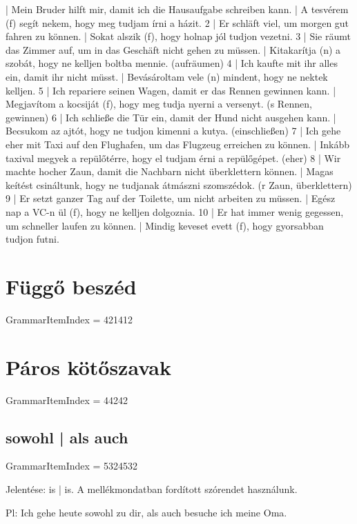 \documentclass{article}
\newenvironment{desc}{\verbatim}{\endverbatim}
\newenvironment{exmp}{\verbatim}{\endverbatim}
\begin{document}
\begin{exmp}
1 | Mein Bruder hilft mir, damit ich die Hausaufgabe schreiben kann. | A tesvérem (f) segít nekem, hogy meg tudjam írni a házit.
2 | Er schläft viel, um morgen gut fahren zu können. | Sokat alszik (f), hogy holnap jól tudjon vezetni.
3 | Sie räumt das Zimmer auf, um in das Geschäft nicht gehen zu müssen. | Kitakarítja (n) a szobát, hogy ne kelljen boltba mennie. (aufräumen)
4 | Ich kaufte mit ihr alles ein, damit ihr nicht müsst. | Bevásároltam vele (n) mindent, hogy ne nektek kelljen.
5 | Ich repariere seinen Wagen, damit er das Rennen gewinnen kann. | Megjavítom a kocsiját (f), hogy meg tudja nyerni a versenyt. (s Rennen, gewinnen)
6 | Ich schließe die Tür ein, damit der Hund nicht ausgehen kann. | Becsukom az ajtót, hogy ne tudjon kimenni a kutya. (einschließen)
7 | Ich gehe eher mit Taxi auf den Flughafen, um das Flugzeug erreichen zu können. | Inkább taxival megyek a repülőtérre, hogy el tudjam érni a repülőgépet. (eher)
8 | Wir machte hocher Zaun, damit die Nachbarn nicht überklettern können. | Magas keítést csináltunk, hogy ne tudjanak átmászni szomszédok. (r Zaun, überklettern)
9 | Er setzt ganzer Tag auf der Toilette, um nicht arbeiten zu müssen. | Egész nap a VC-n ül (f), hogy ne kelljen dolgoznia.
10 | Er hat immer wenig gegessen, um schneller laufen zu können. | Mindig keveset evett (f), hogy gyorsabban tudjon futni.
\end{exmp}

\section{Függő beszéd}

GrammarItemIndex = 421412

\section{Páros kötőszavak}

GrammarItemIndex = 44242

\subsection{sowohl | als auch}

GrammarItemIndex = 5324532

\begin{desc}
Jelentése: is | is. A mellékmondatban fordított szórendet használunk.

Pl: Ich gehe heute sowohl zu dir, als auch besuche ich meine Oma. 
\end{desc}
\end{document}
